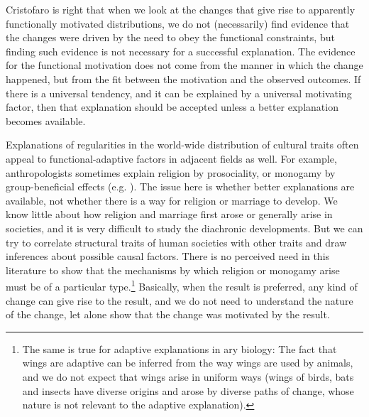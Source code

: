 \documentclass[output=paper]{langsci/langscibook}
\begin{document}
Cristofaro\label{Haspelmathchapterpageref} is right that when we look at the changes that give rise to apparently functionally motivated distributions, we do not (necessarily) find evidence that the changes were driven by the need to obey the functional constraints, but finding such evidence is not necessary for a successful explanation.
The evidence for the functional motivation does not come from the manner in which the change happened, but from the fit between the motivation and the observed outcomes. If there is a universal tendency, and it can be explained by a universal motivating factor, then that explanation should be accepted unless a better explanation becomes available.

Explanations of regularities in the world-wide distribution of cultural traits often appeal to functional-adaptive factors in adjacent fields as well. For example, anthropologists sometimes explain religion by prosociality, or monogamy by group-beneficial effects (e.g. \citealt{PaciottiEtAl2011,HenrichEtAl2012}). The issue here is whether better explanations are available, not whether there is a way for religion or marriage to develop. We know little about how religion and marriage first arose or generally arise in societies, and it is very difficult to study the diachronic developments. But we can try to correlate structural traits of human societies with other traits and draw inferences about possible causal factors. There is no perceived need in this literature to show that the mechanisms by which religion or monogamy arise must be of a particular type.\footnote{The same is true for adaptive explanations in ary biology: The fact that wings are adaptive can be inferred from the way wings are used by animals, and we do not expect that wings arise in uniform ways (wings of birds, bats and insects have diverse origins and arose by diverse paths of change, whose nature is not relevant to the adaptive explanation).} Basically, when the result is preferred, any kind of change can give rise to the result, and we do not need to understand the nature of the change, let alone show that the change was motivated by the result.
\newpage
\end{document}
